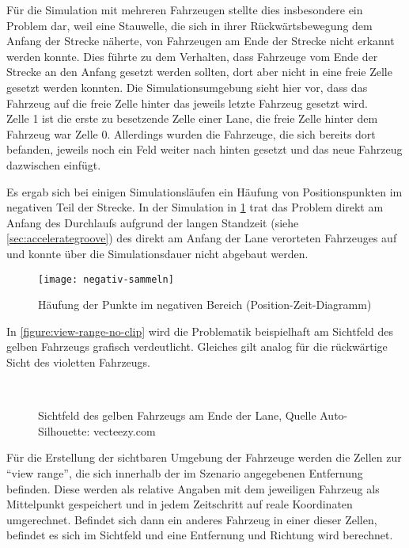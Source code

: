 Für die Simulation mit mehreren Fahrzeugen stellte dies insbesondere ein Problem dar, weil eine Stauwelle, die sich in ihrer Rückwärtsbewegung dem Anfang der Strecke näherte, von Fahrzeugen am Ende der Strecke nicht erkannt werden konnte.
Dies führte zu dem Verhalten, dass Fahrzeuge vom Ende der Strecke an den Anfang gesetzt werden sollten, dort aber nicht in eine freie Zelle gesetzt werden konnten.
Die Simulationsumgebung sieht hier vor, dass das Fahrzeug auf die freie Zelle hinter das jeweils letzte Fahrzeug gesetzt wird.
\\
Zelle 1 ist die erste zu besetzende Zelle einer Lane, die freie Zelle hinter dem Fahrzeug war Zelle 0.
Allerdings wurden die Fahrzeuge, die sich bereits dort befanden, jeweils noch ein Feld weiter nach hinten gesetzt und das neue Fahrzeug dazwischen einfügt.

Es ergab sich bei einigen Simulationsläufen ein Häufung von Positionspunkten im negativen Teil der Strecke.
In der Simulation in \cref{figure:negativ-sammeln} trat das Problem direkt am Anfang des Durchlaufs aufgrund der langen Standzeit (siehe \cref{sec:accelerategroove}) des direkt am Anfang der Lane verorteten Fahrzeuges auf und konnte über die Simulationsdauer nicht abgebaut werden.
\begin{figure}[hptb]
 \centering
 \texttt{[image: negativ-sammeln]}
 \caption[Punktehäufung im negativen Bereich]
 		 {Häufung der Punkte im negativen Bereich (Position-Zeit-Diagramm)}
 \label{figure:negativ-sammeln}
\end{figure} 

In \cref{figure:view-range-no-clip} wird die Problematik beispielhaft am Sichtfeld des gelben Fahrzeugs grafisch verdeutlicht. 
Gleiches gilt analog für die rückwärtige Sicht des violetten Fahrzeugs.

\begin{figure}[hptb]
  \centering
     \\
  \caption[Umbrechen des Sichtfelds eines Fahrzeugs am Ende der Lane]
          {Sichtfeld des gelben Fahrzeugs am Ende der Lane, Quelle Auto-Silhouette: vecteezy.com}
  \label{figure:view-range-no-clip-clip}
\end{figure}

Für die Erstellung der sichtbaren Umgebung der Fahrzeuge werden die Zellen zur \enquote{view range}, die sich innerhalb der im Szenario angegebenen Entfernung befinden.
Diese werden als relative Angaben mit dem jeweiligen Fahrzeug als Mittelpunkt gespeichert und in jedem Zeitschritt auf reale Koordinaten umgerechnet.
Befindet sich dann ein anderes Fahrzeug in einer dieser Zellen, befindet es sich im Sichtfeld und eine Entfernung und Richtung wird berechnet.


